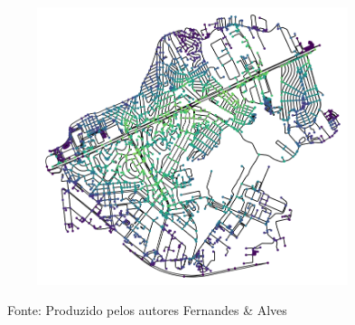 \begin{figure}[htb]
\begin{subfigure}{.46\textwidth}
        \includegraphics[width=.98\linewidth]{images/5_emp_bebidas/street_network_analysis/network_centrality_cumbica.png}
        \label{fig:network_centrality_cumbica}
    \end{subfigure}
    \caption*{\ Fonte: Produzido pelos autores Fernandes \& Alves}
 \end{figure}

